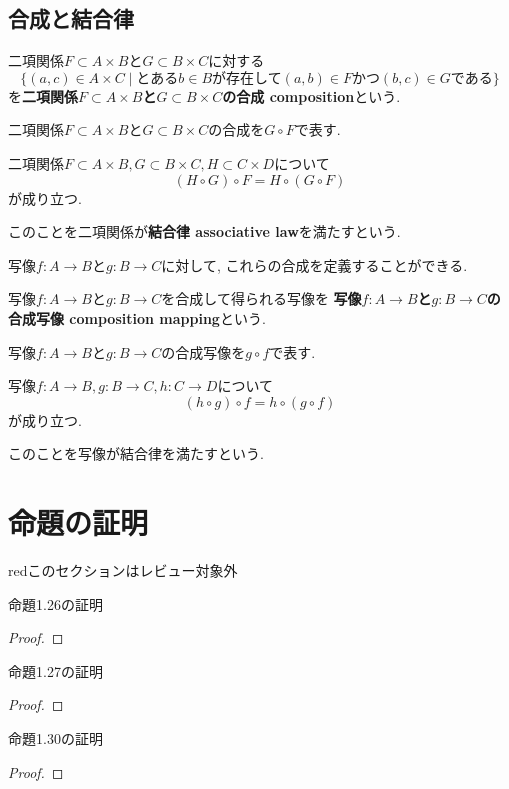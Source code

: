 \subsection{合成と結合律}
\begin{Def}
二項関係$F\subset A\times B$と$G\subset B\times C$に対する
\[
\{(a,c)\in A\times C\mid \text{とある}b\in B\text{が存在して}(a,b)\in F \text{かつ} (b,c)\in G\text{である}\}
\]
を{\bf 二項関係$F\subset A\times B$と$G\subset B\times C$の合成 composition}という.
\end{Def}
\begin{Notation}
二項関係$F\subset A\times B$と$G\subset B\times C$の合成を$G\circ F$で表す.
\end{Notation}
\begin{Prop}
二項関係$F\subset A\times B ,G\subset B\times C, H\subset C\times D$について
\[
(H\circ G)\circ F=H\circ (G\circ F)
\]
が成り立つ.
\end{Prop}

このことを二項関係が{\bf 結合律 associative law}を満たすという.
\begin{Prop}
写像$f:A\rightarrow B$と$g:B\rightarrow C$に対して,
これらの合成を定義することができる.
\end{Prop}

\begin{Def}
写像$f:A\rightarrow B$と$g:B\rightarrow C$を合成して得られる写像を
{\bf 写像$f:A\rightarrow B$と$g:B\rightarrow C$の合成写像 composition mapping}という.
\end{Def}
\begin{Notation}
写像$f:A\rightarrow B$と$g:B\rightarrow C$の合成写像を$g\circ f$で表す.
\end{Notation}
\begin{Prop}
写像$f:A\rightarrow B, g:B\rightarrow C,
h:C\rightarrow D$について
\[
(h\circ g)\circ f=h\circ(g\circ f)
\]
が成り立つ.
\end{Prop}

このことを写像が結合律を満たすという.


\section{命題の証明}
\begin{color}{red}このセクションはレビュー対象外\end{color}

命題1.26の証明
\begin{proof}
\end{proof}
命題1.27の証明
\begin{proof}
\end{proof}
命題1.30の証明
\begin{proof}
\end{proof}
